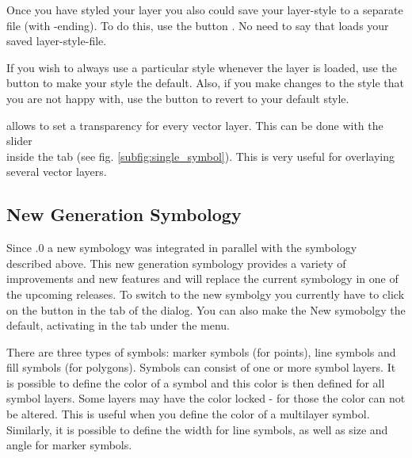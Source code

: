 Once you have styled your layer you also could save your layer-style to a
separate file (with -ending).
To do this, use the button . No need to say that
 loads your saved layer-style-file.

If you wish to always use a particular style whenever the layer is loaded,
use the  button to make your style the default. Also,
if you make changes to the style that you are not happy with, use the  button to revert to your default style.

 \label{sec:vect_transparency}

\qg allows to set a transparency for every vector layer. This can be done with
the slider \\
 inside the  tab (see
fig. \ref{subfig:single_symbol}). This is very useful for overlaying several
vector layers.

\subsection{New Generation Symbology}

Since .0  a new symbology was integrated in parallel with the symbology
described above. This new generation symbology provides a variety of improvements and
new features and will replace the current symbology in one of the upcoming releases.
To switch to the new symbolgy you currently have to click on the  button in the  tab of the  dialog. You can
also make the New symobolgy the default, activating  in the  tab under the  \arrow {} menu.


There are three types of symbols: marker symbols (for points), line symbols and
fill symbols (for polygons). Symbols can consist of one or more symbol layers. It
is possible to define the color of a symbol and this color is then defined for all
symbol layers. Some layers may have the color locked - for those the color can not
be altered. This is useful when you define the color of a multilayer symbol.
Similarly, it is possible to define the width for line symbols, as well as size and
angle for marker symbols.

